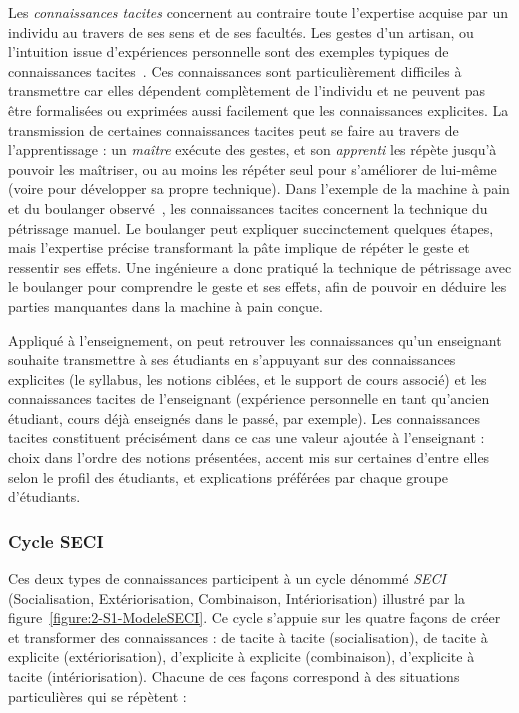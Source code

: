 \bigskip

Les \textit{connaissances tacites} concernent au contraire toute l'expertise acquise par un individu au travers de ses sens et de ses facultés.
Les gestes d'un artisan, ou l'intuition issue d'expériences personnelle sont des exemples typiques de connaissances tacites~\cite{north2018knowledge}\cite{syed2018palgrave}\cite{nonaka2007knowledge}.
Ces connaissances sont particulièrement difficiles à transmettre car elles dépendent complètement de l'individu et ne peuvent pas être formalisées ou exprimées aussi facilement que les connaissances explicites.
La transmission de certaines connaissances tacites peut se faire au travers de l'apprentissage : un \textit{maître} exécute des gestes, et son \textit{apprenti} les répète jusqu'à pouvoir les maîtriser, ou au moins les répéter seul pour s'améliorer de lui-même (voire pour développer sa propre technique).
Dans l'exemple de la machine à pain et du boulanger observé~\cite{nonaka2007knowledge}, les connaissances tacites concernent la technique du pétrissage manuel.
Le boulanger peut expliquer succinctement quelques étapes, mais l'expertise précise transformant la pâte implique de répéter le geste et ressentir ses effets.
Une ingénieure a donc pratiqué la technique de pétrissage avec le boulanger pour comprendre le geste et ses effets, afin de pouvoir en déduire les parties manquantes dans la machine à pain conçue.

Appliqué à l'enseignement, on peut retrouver les connaissances qu'un enseignant souhaite transmettre à ses étudiants en s'appuyant sur des connaissances explicites (le syllabus, les notions ciblées, et le support de cours associé) et les connaissances tacites de l'enseignant (expérience personnelle en tant qu'ancien étudiant, cours déjà enseignés dans le passé, par exemple).
Les connaissances tacites constituent précisément dans ce cas une valeur ajoutée à l'enseignant : choix dans l'ordre des notions présentées, accent mis sur certaines d'entre elles selon le profil des étudiants, et explications préférées par chaque groupe d'étudiants.

\bigskip

\subsubsection{Cycle SECI}
\label{subsubsection:Contexte:KIP-RevueLitterature:KM:SECI}

Ces deux types de connaissances participent à un cycle dénommé \textit{SECI}~\cite{nonaka2007knowledge} (Socialisation, Extériorisation, Combinaison, Intériorisation) illustré par la figure~\ref{figure:2-S1-ModeleSECI}.
Ce cycle s'appuie sur les quatre façons de créer et transformer des connaissances : de tacite à tacite (socialisation), de tacite à explicite (extériorisation), d'explicite à explicite (combinaison), d'explicite à tacite (intériorisation).
Chacune de ces façons correspond à des situations particulières qui se répètent :

